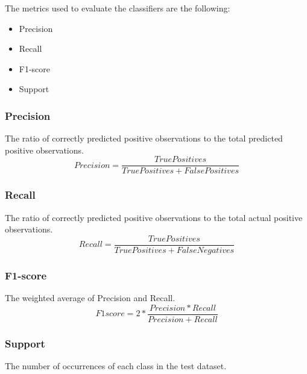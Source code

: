 The metrics used to evaluate the classifiers are the following:
\begin{itemize}
  \item Precision
  \item Recall
  \item F1-score
  \item Support
\end{itemize}

\subsubsection{Precision}
The ratio of correctly predicted positive observations to the total predicted 
positive observations.
\begin{equation}
  Precision = \frac{TruePositives}{TruePositives + FalsePositives}
\end{equation}

\subsubsection{Recall}
The ratio of correctly predicted positive observations to the total actual positive observations.
\begin{equation}
  Recall = \frac{TruePositives}{TruePositives + FalseNegatives}
\end{equation}

\subsubsection{F1-score}
The weighted average of Precision and Recall.
\begin{equation}
  F1score = 2 * \frac{Precision * Recall}{Precision + Recall}
\end{equation}

\subsubsection{Support}
The number of occurrences of each class in the test dataset.